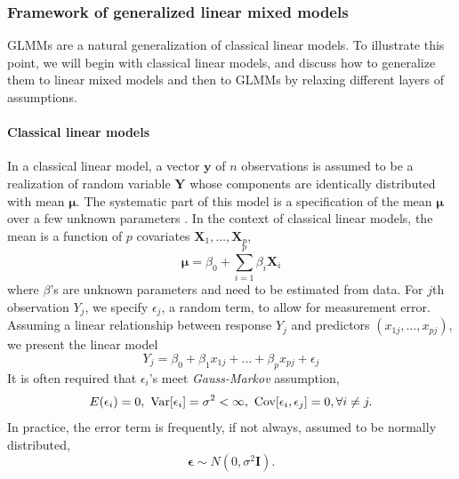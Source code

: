 \subsubsection{Framework of generalized linear mixed models}\label{subsubsec:intro-stat-framework}
GLMMs are a natural generalization of classical linear models. To illustrate this point, we will
begin with classical linear models, and discuss how to generalize them to linear mixed models and
then to GLMMs by relaxing different layers of assumptions. 
\paragraph{Classical linear models}\label{para:clm}
In a classical linear model, a vector $\bm y$ of $n$ observations is assumed to be a realization
of random variable $\bm Y$ whose components are identically distributed with mean $\bm \mu$. The
systematic part of this model is a specification of the mean $\bm\mu$ over a few unknown parameters
\citep{mccullagh1989generalized}. In the context of classical linear models, the mean is a function
of $p$ covariates $\bm X_1, \ldots, \bm X_p$,
\begin{equation}\label{eq:clm}
	\bm \mu =\beta_0 + \sum_{i=1}^p\beta_i \bm X_i
\end{equation}	
where $\beta$'s are unknown parameters and need to be estimated from data. For
$j$th %
 observation $Y_j$, we specify $\epsilon_j$, a random term, to allow for measurement error.
Assuming a linear relationship between response $Y_j$ and predictors $(x_{1j}, \ldots, x_{pj})$, we
present the linear model 
\begin{equation}\label{eq:clm2}
	Y_j= \beta_0 + \beta_1x_{1j} + \ldots + \beta_p x_{pj} + \epsilon_j
\end{equation}
It is often required that $\epsilon_i$'s meet \textit{Gauss-Markov} assumption,
\begin{equation}\label{eq:gauss-markov}
	E(\epsilon_i)=0,~ \text{Var}[\epsilon_i]=
	\sigma^2<\infty, ~\text{Cov}[\epsilon_i, \epsilon_j]=0, \forall i \neq j.
\end{equation}
In practice, the error term is frequently, if not always, assumed to be normally distributed, 
\begin{equation}\label{eq:normalassumption1}
	\bm \epsilon \sim N(0, \sigma^2 \bm I).
\end{equation}

